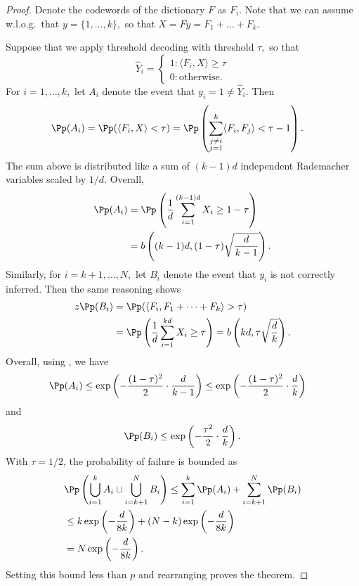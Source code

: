 \begin{proof}
	Denote the codewords of the dictionary $F$ as $F_i.$ Note that we can assume w.l.o.g.\ that $y = \{ 1, ..., k \},$ so that $X = F y = F_1 + \dots + F_k.$

	Suppose that we apply threshold decoding with threshold $\tau,$ so that
	$$
		\hat{Y}_i = \begin{cases}
			1 : \langle F_i, X \rangle \ge \tau \\
			0 : \text{otherwise.}
		\end{cases}
	$$
	For $i = 1, \dots, k, $ let $A_i$ denote the event that $y_i = 1 \neq \hat{Y}_i.$ Then
	\begin{align*}
		\Pp(A_i) & = \Pp(\langle F_i, X \rangle < \tau) = \Pp\left( \sum_{\substack{j \neq i \\ j = 1}}^k \langle F_i, F_j \rangle < \tau - 1 \right).
	\end{align*}
	The sum above is distributed like a sum of $(k - 1)d$ independent Rademacher variables scaled by $1/d.$ Overall,
	\begin{align*}
		\Pp(A_i) & = \Pp\left(\frac 1 {d} \sum_{i = 1}^{(k - 1)d} X_i \ge 1 - \tau \right) \\
		         & = b\left((k - 1) d, (1 - \tau) \sqrt{\frac {d} {k - 1}}\right).
	\end{align*}
	Similarly, for $i = k + 1, \dots, N,$ let $B_i$ denote the event that $y_i$ is not correctly inferred. Then the same reasoning shows
	\begin{align*}z
		\Pp(B_i) & = \Pp(\langle F_i, F_1 + \dots + F_k \rangle > \tau)                                                            \\
		         & = \Pp\left(\frac 1 {d} \sum_{i = 1}^{k d} X_i \ge \tau \right)  = b\left(k d, \tau \sqrt{\frac {d} {k}}\right).
	\end{align*}
	Overall, using , we have
	\begin{align*}
		\Pp(A_i) & \le \exp\left(-\frac{(1-\tau)^2}{2} \cdot \frac{d}{k-1}\right) \le \exp\left(-\frac{(1-\tau)^2}{2} \cdot \frac{d}{k}\right)
	\end{align*}
	and
	$$
		\Pp(B_i) \le \exp\left(-\frac{\tau^2}{2} \cdot \frac{d}{k}\right).
	$$
	With $\tau = 1/2$, the probability of failure is bounded as
	\begin{align*}
		 & \Pp\left(\bigcup_{i=1}^k A_i \cup \bigcup_{i=k+1}^N B_i\right)
		\leq \sum_{i=1}^k \Pp(A_i) + \sum_{i=k+1}^N \Pp(B_i)                           \\
		 & \leq k \exp\left(-\frac{d}{8k}\right) + (N-k)\exp\left(-\frac{d}{8k}\right) \\
		 & = N\exp\left(-\frac{d}{8k}\right).
	\end{align*}
	Setting this bound less than $p$ and rearranging proves the theorem.
\end{proof}

